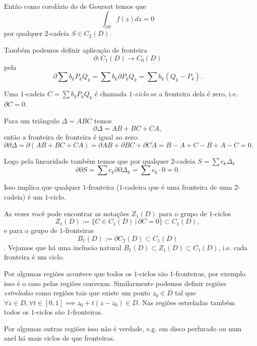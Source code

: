 Então como corolário do  de Goursat temos que
\[ \int_{\partial S} f(z) dz = 0 \]
por qualquer $2$-cadeia $S \in C_2(D)$.

Também podemos definir aplicação de fronteira 
\[ \partial : C_1(D) \to C_0(D) \]
pela
\[ \partial \sum b_k P_k Q_k = \sum b_k \partial  P_kQ_k = \sum b_k (Q_k - P_k). \]

Uma $1$-cadeia $C = \sum b_k P_k Q_k$ é chamada \emph{$1$-ciclo} se a fronteira dela é zero, i.e. $\partial C = 0$.

Para um triângulo $\Delta = ABC$ temos
\[
\partial \Delta = AB + BC + CA,
\]
então a fronteira de fronteira é igual ao zero:
\[
\partial \partial \Delta = \partial (AB + BC + CA)  = \partial AB + \partial BC + \partial CA = B-A + C-B + A-C = 0.
\]

Logo pela linearidade também temos que por qualquer $2$-cadeia $S = \sum c_k \Delta_k$
\[ \partial \partial S = \sum c_k \partial \partial \Delta_k = \sum c_k \cdot 0 =  0. \]

Isso implica que qualquer $1$-fronteira ($1$-cadeira que é uma fronteira de uma $2$-cadeia) é um $1$-ciclo.

As vezes você pode encontrar as notações $Z_1(D)$ para o grupo de $1$-ciclos
\[ Z_1(D) := \{ C \in C_1(D) \,|\, \partial C = 0 \} \subset C_1(D), \]
e para o grupo de $1$-fronteiras
\[ B_1(D) := \partial C_2(D) \subset C_1(D) \].
Vejamos que há uma inclusão natural $B_1(D) \subset Z_1(D) \subset C_1(D)$,
i.e. cada fronteira é um ciclo.

Por algumas regiões acontece que todos os $1$-ciclos são $1$-fronteiras,
por exemplo isso é o caso pelas regiões convexas.
Similarmente podemos definir regiões \emph{estreladas} como regiões tais que existe um ponto $z_0 \in D$ tal que
$\forall z\in D, \forall t \in [0,1] \implies z_0 + t (z-z_0) \in D$. Nas regiões estreladas também
todos os $1$-ciclos são $1$-fronteiras.

Por algumas outras regiões isso não é verdade, e.g. em disco perfurado ou num anel há mais ciclos de que fronteiras.


